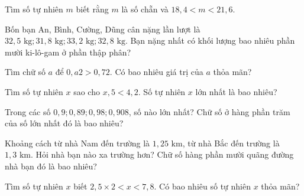 \begin{ex}
  Tìm số tự nhiên $m$ biết rằng $m$ là số chẵn và $18{,}4 < m < 21{,}6$.
\end{ex}

\begin{ex}
  Bốn bạn An, Bình, Cường, Dũng cân nặng lần lượt là $32{,}5\text{ kg}; 31{,}8\text{ kg}; 33{,}2\text{ kg}; 32{,}8\text{ kg}$. Bạn nặng nhất có khối lượng bao nhiêu phần mười ki-lô-gam ở phần thập phân?
\end{ex}

\begin{ex}
  Tìm chữ số $a$ để $0{,}a2 > 0{,}72$. Có bao nhiêu giá trị của $a$ thỏa mãn?
\end{ex}

\begin{ex}
  Tìm số tự nhiên $x$ sao cho $x{,}5 < 4{,}2$. Số tự nhiên $x$ lớn nhất là bao nhiêu?
\end{ex}

\begin{ex}
  Trong các số $0{,}9; 0{,}89; 0{,}98; 0{,}908$, số nào lớn nhất? Chữ số ở hàng phần trăm của số lớn nhất đó là bao nhiêu?
\end{ex}

\begin{ex}
  Khoảng cách từ nhà Nam đến trường là $1{,}25\text{ km}$, từ nhà Bắc đến trường là $1{,}3\text{ km}$. Hỏi nhà bạn nào xa trường hơn? Chữ số hàng phần mười quãng đường nhà bạn đó là bao nhiêu?
\end{ex}

\begin{ex}
  Tìm số tự nhiên $x$ biết $2{,}5 \times 2 < x < 7{,}8$. Có bao nhiêu số tự nhiên $x$ thỏa mãn?
\end{ex}

